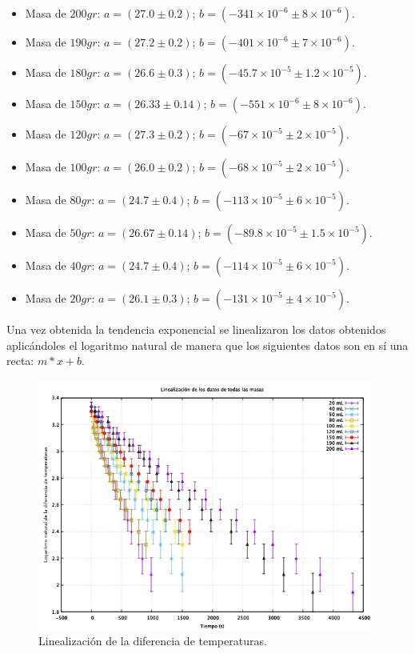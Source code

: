 \documentclass[a4paper]{article}
\begin{document}
\begin{itemize}
  \item Masa de $200 gr$: $a=(27.0\pm0.2)$; $b=(-341\times10^{-6} \pm 8\times 10^{-6})$.
  \item Masa de $190 gr$: $a=(27.2\pm0.2)$; $b=(-401\times10^{-6} \pm 7\times 10^{-6})$.
  \item Masa de $180 gr$: $a=(26.6\pm0.3)$; $b=(-45.7\times10^{-5} \pm 1.2\times 10^{-5})$.
  
  \item Masa de $150 gr$: $a=(26.33\pm0.14)$; $b=(-551\times10^{-6} \pm 8\times 10^{-6})$.
  \item Masa de $120 gr$: $a=(27.3\pm0.2)$; $b=(-67\times10^{-5} \pm 2\times 10^{-5})$.
  \item Masa de $100 gr$: $a=(26.0\pm0.2)$; $b=(-68\times10^{-5} \pm 2\times 10^{-5})$.
  \item Masa de $80 gr$: $a=(24.7\pm0.4)$; $b=(-113\times10^{-5} \pm 6\times 10^{-5})$.
  \item Masa de $50 gr$: $a=(26.67\pm0.14)$; $b=(-89.8\times10^{-5} \pm 1.5\times 10^{-5})$.
  \item Masa de $40 gr$: $a=(24.7\pm0.4)$; $b=(-114\times10^{-5} \pm 6\times 10^{-5})$.
  \item Masa de $20 gr$: $a=(26.1\pm0.3)$; $b=(-131\times10^{-5} \pm 4\times 10^{-5})$.
\end{itemize}

Una vez obtenida la tendencia exponencial se linealizaron los datos obtenidos aplicándoles el logaritmo natural de manera que los siguientes datos son en sí una recta: $m*x+b$.

\begin{figure}[H]
    \centering
    \includegraphics[width=11cm]{Lineali.png}%
    \caption{Linealización de la diferencia de temperaturas.}%
\end{figure}
\end{document}
